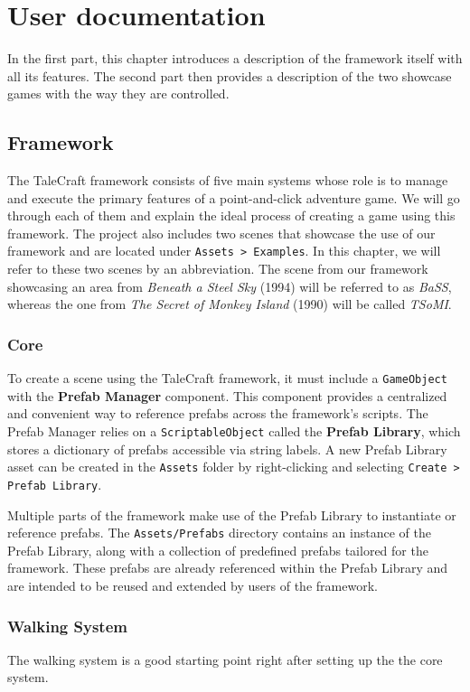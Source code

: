 \chapter{User documentation}
In the first part, this chapter introduces a description of the framework itself with all its features. The second part then provides a description of the two showcase games with the way they are controlled.  

\section{Framework}
The TaleCraft framework consists of five main systems whose role is to manage and execute the primary features of a point-and-click adventure game. We will go through each of them and explain the ideal process of creating a game using this framework. The project also includes two scenes that showcase the use of our framework and are located under \verb|Assets > Examples|. In this chapter, we will refer to these two scenes by an abbreviation. The scene from our framework showcasing an area from \textit{Beneath a Steel Sky} (1994) will be referred to as \textit{BaSS}, whereas the one from \textit{The Secret of Monkey Island} (1990) will be called \textit{TSoMI}.

\subsection{Core}
To create a scene using the TaleCraft framework, it must include a \verb|GameObject| with the \textbf{Prefab Manager} component. This component provides a centralized and convenient way to reference prefabs across the framework's scripts. The Prefab Manager relies on a \verb|ScriptableObject| called the \textbf{Prefab Library}, which stores a dictionary of prefabs accessible via string labels. A new Prefab Library asset can be created in the \verb|Assets| folder by right-clicking and selecting \verb|Create > Prefab Library|.

Multiple parts of the framework make use of the Prefab Library to instantiate or reference prefabs. The \verb|Assets/Prefabs| directory contains an instance of the Prefab Library, along with a collection of predefined prefabs tailored for the framework. These prefabs are already referenced within the Prefab Library and are intended to be reused and extended by users of the framework.

\subsection{Walking System}
The walking system is a good starting point right after setting up the the core system. 

